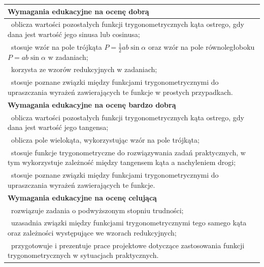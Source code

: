 \documentclass[12pt,a4paper]{article}
\begin{document}
\begin{longtable}{|p{16cm}|}
		\textbf{Wymagania edukacyjne na ocenę dobrą} \\ \hline
		
		\textbullet\ oblicza wartości pozostałych funkcji trygonometrycznych kąta ostrego, gdy dana jest wartość jego sinusa lub cosinusa; \\
		
		\textbullet\ stosuje wzór na pole trójkąta $P=\frac{1}{2}ab\sin\alpha$ oraz wzór na pole równoległoboku $P=ab\sin\alpha$ w zadaniach; \\
		
		\textbullet\ korzysta ze wzorów redukcyjnych w zadaniach; \\
		
		\textbullet\ stosuje poznane związki między funkcjami trygonometrycznymi do upraszczania wyrażeń zawierających te funkcje w prostych przypadkach. \\ \hline
		
		\textbf{Wymagania edukacyjne na ocenę bardzo dobrą} \\ \hline
		
		\textbullet\ oblicza wartości pozostałych funkcji trygonometrycznych kąta ostrego, gdy dana jest wartość jego tangensa; \\
		
		\textbullet\ oblicza pole wielokąta, wykorzystując wzór na pole trójkąta; \\
		
		\textbullet\ stosuje funkcje trygonometryczne do rozwiązywania zadań praktycznych, w tym wykorzystuje zależność między tangensem kąta a nachyleniem drogi; \\
		
		\textbullet\ stosuje poznane związki między funkcjami trygonometrycznymi do upraszczania wyrażeń zawierających te funkcje. \\ \hline
		
		\textbf{Wymagania edukacyjne na ocenę celującą} \\ \hline
		
		\textbullet\ rozwiązuje zadania o podwyższonym stopniu trudności; \\
		
		\textbullet\ uzasadnia związki między funkcjami trygonometrycznymi tego samego kąta oraz zależności występujące we wzorach redukcyjnych; \\
		
		\textbullet\ przygotowuje i prezentuje prace projektowe dotyczące zastosowania funkcji trygonometrycznych w sytuacjach praktycznych. \\ \hline
		
	\end{longtable}
	
\end{document}
